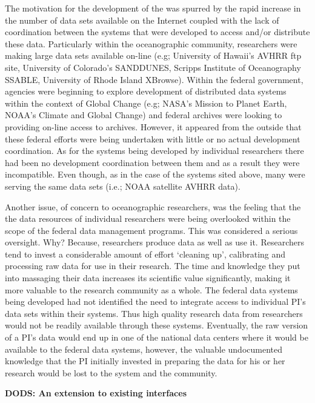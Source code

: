 \noindent The motivation for the development of the \dods was spurred by the
rapid increase in the number of data sets available on the Internet coupled
with the lack of coordination between the systems that were developed to
access and/or distribute these data.  Particularly within the oceanographic
community, researchers were making large data sets available on-line (e.g;
University of Hawaii's AVHRR ftp site, University of Colorado's SANDDUNES,
Scripps Institute of Oceanography SSABLE, University of Rhode Island
XBrowse).  Within the federal government, agencies were beginning to explore
development of distributed data systems within the context of Global Change
(e.g; NASA's Mission to Planet Earth, NOAA's Climate and Global Change) and
federal archives were looking to providing on-line access to archives.
However, it appeared from the outside that these federal efforts were being
undertaken with little or no actual development coordination.  As for the
systems being developed by individual researchers there had been no
development coordination between them and as a result they were incompatible.
Even though, as in the case of the systems sited above, many were serving the
same data sets (i.e.; NOAA satellite AVHRR data).

Another issue, of concern to oceanographic researchers, was the feeling that
the the data resources of individual researchers were being overlooked within
the scope of the federal data management programs.  This was considered a
serious oversight.  Why?  Because, researchers produce data as well as use
it.  Researchers tend to invest a considerable amount of effort `cleaning
up', calibrating and processing raw data for use in their research.  The time
and knowledge they put into massaging their data increases its scientific
value significantly, making it more valuable to the research community as a
whole.  The federal data systems being developed had not identified the need
to integrate access to individual PI's data sets within their systems.  Thus
high quality research data from researchers would not be readily available
through these systems.  Eventually, the raw version of a PI's data would end
up in one of the national data centers where it would be available to the
federal data systems, however, the valuable undocumented knowledge that the
PI initially invested in preparing the data for his or her research would be
lost to the system and the community.

\large
\bigskip
\noindent
{\bf DODS: An extension to existing interfaces}
\medskip
\normalsize 

